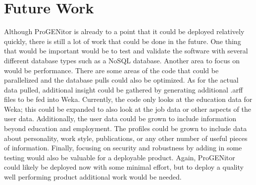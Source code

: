 \section{Future Work}
\label{sect:future-work}
Although ProGENitor is already to a point that it could be deployed relatively
quickly, there is still a lot of work that could be done in the future.  One
thing that would be important would be to test and validate the software with
several different database types such as a NoSQL database.  Another area to
focus on would be performance.  There are some areas of the code that could be
parallelized and the database pulls could also be optimized.  As for the actual
data pulled, additional insight could be gathered by generating additional .arff
files to be fed into Weka.  Currently, the code only looks at the education data
for Weka; this could be expanded to also look at the job data or other aspects
of the user data.  Additionally, the user data could be grown to include
information beyond education and employment.  The profiles could be grown to
include data about personality, work style, publications, or any other number of
useful pieces of information.  Finally, focusing on security and robustness by
adding in some testing would also be valuable for a deployable product.  Again,
ProGENitor could likely be deployed now with some minimal effort, but to deploy
a quality well performing product additional work would be needed.
